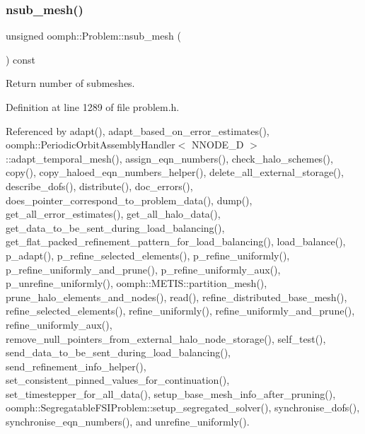 \mbox{\label{classoomph_1_1Problem_accc4e5a46953800933f07ae6bd67860e}} 
\subsubsection{\texorpdfstring{nsub\+\_\+mesh()}{nsub\_mesh()}}
{\footnotesize\ttfamily unsigned oomph\+::\+Problem\+::nsub\+\_\+mesh (\begin{DoxyParamCaption}{ }\end{DoxyParamCaption}) const\hspace{0.3cm}{\ttfamily [inline]}}



Return number of submeshes. 



Definition at line 1289 of file problem.\+h.



Referenced by adapt(), adapt\+\_\+based\+\_\+on\+\_\+error\+\_\+estimates(), oomph\+::\+Periodic\+Orbit\+Assembly\+Handler$<$ N\+N\+O\+D\+E\+\_\+D $>$\+::adapt\+\_\+temporal\+\_\+mesh(), assign\+\_\+eqn\+\_\+numbers(), check\+\_\+halo\+\_\+schemes(), copy(), copy\+\_\+haloed\+\_\+eqn\+\_\+numbers\+\_\+helper(), delete\+\_\+all\+\_\+external\+\_\+storage(), describe\+\_\+dofs(), distribute(), doc\+\_\+errors(), does\+\_\+pointer\+\_\+correspond\+\_\+to\+\_\+problem\+\_\+data(), dump(), get\+\_\+all\+\_\+error\+\_\+estimates(), get\+\_\+all\+\_\+halo\+\_\+data(), get\+\_\+data\+\_\+to\+\_\+be\+\_\+sent\+\_\+during\+\_\+load\+\_\+balancing(), get\+\_\+flat\+\_\+packed\+\_\+refinement\+\_\+pattern\+\_\+for\+\_\+load\+\_\+balancing(), load\+\_\+balance(), p\+\_\+adapt(), p\+\_\+refine\+\_\+selected\+\_\+elements(), p\+\_\+refine\+\_\+uniformly(), p\+\_\+refine\+\_\+uniformly\+\_\+and\+\_\+prune(), p\+\_\+refine\+\_\+uniformly\+\_\+aux(), p\+\_\+unrefine\+\_\+uniformly(), oomph\+::\+M\+E\+T\+I\+S\+::partition\+\_\+mesh(), prune\+\_\+halo\+\_\+elements\+\_\+and\+\_\+nodes(), read(), refine\+\_\+distributed\+\_\+base\+\_\+mesh(), refine\+\_\+selected\+\_\+elements(), refine\+\_\+uniformly(), refine\+\_\+uniformly\+\_\+and\+\_\+prune(), refine\+\_\+uniformly\+\_\+aux(), remove\+\_\+null\+\_\+pointers\+\_\+from\+\_\+external\+\_\+halo\+\_\+node\+\_\+storage(), self\+\_\+test(), send\+\_\+data\+\_\+to\+\_\+be\+\_\+sent\+\_\+during\+\_\+load\+\_\+balancing(), send\+\_\+refinement\+\_\+info\+\_\+helper(), set\+\_\+consistent\+\_\+pinned\+\_\+values\+\_\+for\+\_\+continuation(), set\+\_\+timestepper\+\_\+for\+\_\+all\+\_\+data(), setup\+\_\+base\+\_\+mesh\+\_\+info\+\_\+after\+\_\+pruning(), oomph\+::\+Segregatable\+F\+S\+I\+Problem\+::setup\+\_\+segregated\+\_\+solver(), synchronise\+\_\+dofs(), synchronise\+\_\+eqn\+\_\+numbers(), and unrefine\+\_\+uniformly().

